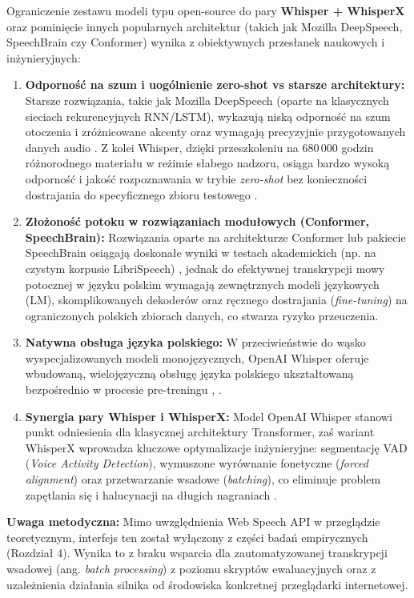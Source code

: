 Ograniczenie zestawu modeli typu open-source do pary \textbf{Whisper + WhisperX} oraz pominięcie innych popularnych architektur (takich jak Mozilla DeepSpeech, SpeechBrain czy Conformer) wynika z obiektywnych przesłanek naukowych i inżynieryjnych:
\begin{enumerate}
    \item \textbf{Odporność na szum i uogólnienie zero-shot vs starsze architektury:} Starsze rozwiązania, takie jak Mozilla DeepSpeech (oparte na klasycznych sieciach rekurencyjnych RNN/LSTM), wykazują niską odporność na szum otoczenia i zróżnicowane akcenty oraz wymagają precyzyjnie przygotowanych danych audio \cite{ferraro2023benchmarking}. Z kolei Whisper, dzięki przeszkoleniu na $680\,000$ godzin różnorodnego materiału w reżimie słabego nadzoru, osiąga bardzo wysoką odporność i jakość rozpoznawania w trybie \textit{zero-shot} bez konieczności dostrajania do specyficznego zbioru testowego \cite{radford2023robust}.
    \item \textbf{Złożoność potoku w rozwiązaniach modułowych (Conformer, SpeechBrain):} Rozwiązania oparte na architekturze Conformer lub pakiecie SpeechBrain osiągają doskonałe wyniki w testach akademickich (np. na czystym korpusie LibriSpeech) \cite{ferraro2023benchmarking}, jednak do efektywnej transkrypcji mowy potocznej w języku polskim wymagają zewnętrznych modeli językowych (LM), skomplikowanych dekoderów oraz ręcznego dostrajania (\textit{fine-tuning}) na ograniczonych polskich zbiorach danych, co stwarza ryzyko przeuczenia.
    \item \textbf{Natywna obsługa języka polskiego:} W przeciwieństwie do wąsko wyspecjalizowanych modeli monojęzycznych, OpenAI Whisper oferuje wbudowaną, wielojęzyczną obsługę języka polskiego ukształtowaną bezpośrednio w procesie pre-treningu \cite{radford2023robust}, \cite{pondel2024e2e}.
    \item \textbf{Synergia pary Whisper i WhisperX:} Model OpenAI Whisper stanowi punkt odniesienia dla klasycznej architektury Transformer, zaś wariant WhisperX wprowadza kluczowe optymalizacje inżynieryjne: segmentację VAD (\textit{Voice Activity Detection}), wymuszone wyrównanie fonetyczne (\textit{forced alignment}) oraz przetwarzanie wsadowe (\textit{batching}), co eliminuje problem zapętlania się i halucynacji na długich nagraniach \cite[s.~2]{ferraro2023benchmarking}.
\end{enumerate}

\vspace{0.2cm}
\noindent\textbf{Uwaga metodyczna:} Mimo uwzględnienia Web Speech API w przeglądzie teoretycznym, interfejs ten został wyłączony z części badań empirycznych (Rozdział 4). Wynika to z braku wsparcia dla zautomatyzowanej transkrypcji wsadowej (ang. \textit{batch processing}) z poziomu skryptów ewaluacyjnych oraz z uzależnienia działania silnika od środowiska konkretnej przeglądarki internetowej.

